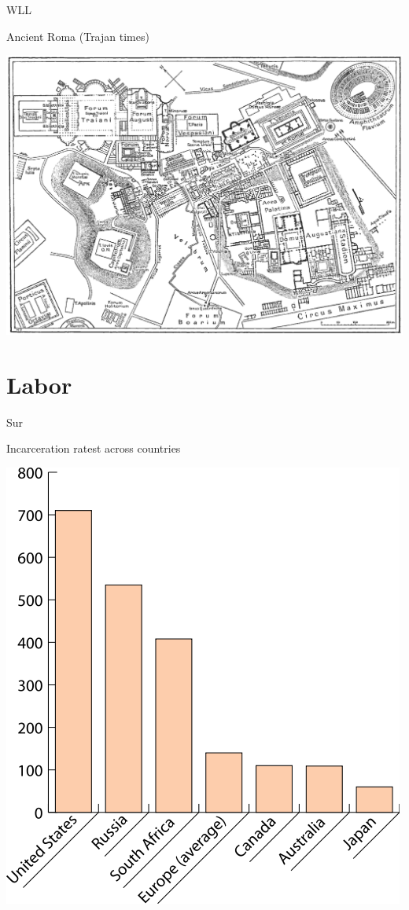 \documentclass[print,Draft]{faosyb}
\begin{document}
\begin{map}{W}{LL}
\caption{Ancient Roma  (Trajan times)}
\label{map:roma}
\includegraphics[width=\chartwidth,height=\chartheight]{Rome}
\end{map}

\section{Labor}



\begin{chart}{S}{ur}
\caption{Incarceration ratest across countries}
\label{chart:incarceration}
\includegraphics[width=\chartwidth,height=\chartheight]{incarceration}  
\end{chart}
\end{document}
